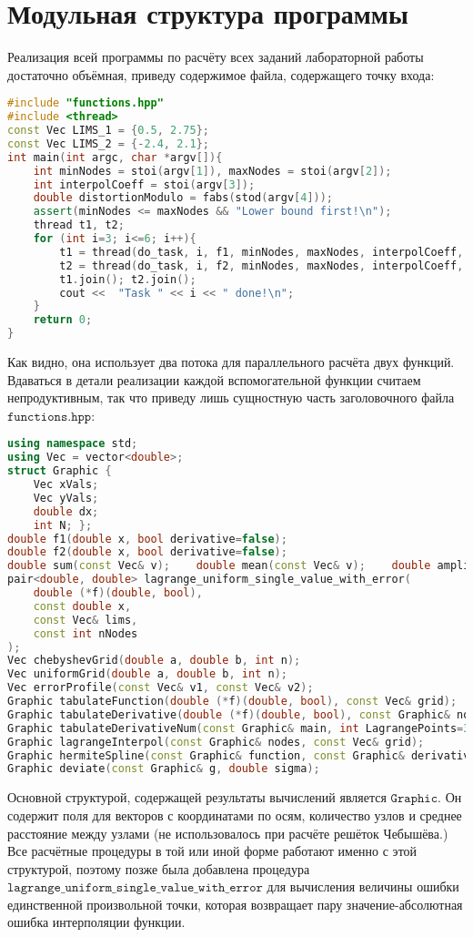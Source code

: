 \section{Модульная структура программы}
Реализация всей программы по расчёту всех заданий лабораторной работы достаточно объёмная, приведу содержимое файла, содержащего точку входа:
\begin{lstlisting}[language=c++]
#include "functions.hpp"
#include <thread>
const Vec LIMS_1 = {0.5, 2.75};
const Vec LIMS_2 = {-2.4, 2.1};
int main(int argc, char *argv[]){
    int minNodes = stoi(argv[1]), maxNodes = stoi(argv[2]);
    int interpolCoeff = stoi(argv[3]);
    double distortionModulo = fabs(stod(argv[4]));
    assert(minNodes <= maxNodes && "Lower bound first!\n");
    thread t1, t2;
    for (int i=3; i<=6; i++){
        t1 = thread(do_task, i, f1, minNodes, maxNodes, interpolCoeff, distortionModulo);
        t2 = thread(do_task, i, f2, minNodes, maxNodes, interpolCoeff, distortionModulo);
        t1.join(); t2.join();
        cout <<  "Task " << i << " done!\n";
    }
    return 0;
}
\end{lstlisting}
Как видно, она использует два потока для параллельного расчёта двух функций. Вдаваться в детали реализации каждой вспомогательной функции считаем непродуктивным, так что приведу лишь сущностную часть заголовочного файла $\mathtt{functions.hpp}$:
\begin{lstlisting}[language=c++]
using namespace std;
using Vec = vector<double>;
struct Graphic {
    Vec xVals;
    Vec yVals;
    double dx;
    int N; };
double f1(double x, bool derivative=false);
double f2(double x, bool derivative=false);
double sum(const Vec& v);    double mean(const Vec& v);    double amplitude(Vec vector);
pair<double, double> lagrange_uniform_single_value_with_error(
    double (*f)(double, bool),
    const double x,
    const Vec& lims,
    const int nNodes
);
Vec chebyshevGrid(double a, double b, int n);
Vec uniformGrid(double a, double b, int n);
Vec errorProfile(const Vec& v1, const Vec& v2);
Graphic tabulateFunction(double (*f)(double, bool), const Vec& grid);
Graphic tabulateDerivative(double (*f)(double, bool), const Graphic& nodes);
Graphic tabulateDerivativeNum(const Graphic& main, int LagrangePoints=3);
Graphic lagrangeInterpol(const Graphic& nodes, const Vec& grid);
Graphic hermiteSpline(const Graphic& function, const Graphic& derivative, int N);
Graphic deviate(const Graphic& g, double sigma);
\end{lstlisting}
Основной структурой, содержащей результаты вычислений является $\mathtt{Graphic}$. Он содержит поля для векторов с координатами по осям, количество узлов и среднее расстояние между узлами (не использовалось при расчёте решёток Чебышёва.) Все расчётные процедуры в той или иной форме работают именно с этой структурой, поэтому позже была добавлена процедура $\mathtt{lagrange\_uniform\_single\_value\_with\_error}$ для вычисления величины ошибки единственной произвольной точки, которая возвращает пару значение-абсолютная ошибка интерполяции функции.


